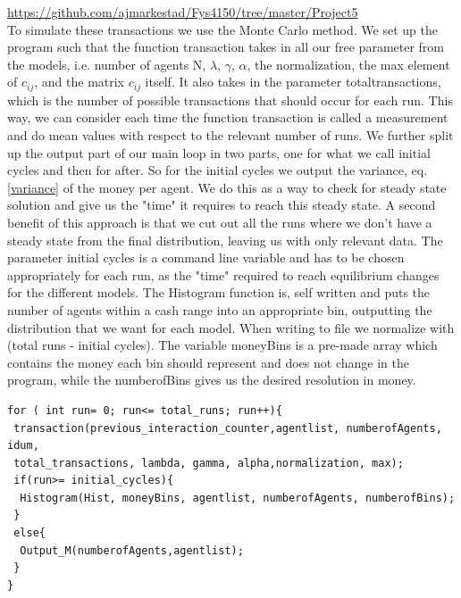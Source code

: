 \documentclass[a4paper,11pt]{article}
\begin{document}
{\url{https://github.com/ajmarkestad/Fys4150/tree/master/Project5}\\

To simulate these transactions we use the Monte Carlo method. We set up the program such that the function transaction takes in all our free parameter from the models, i.e. number of agents N, $\lambda$, $\gamma$, $\alpha$, the normalization, the max element of $c_{ij}$, and the matrix $c_{ij}$ itself. It also takes in the parameter totaltransactions, which is the number of possible transactions that should occur for each run. This way, we can consider each time the function transaction is called a measurement and do mean values with respect to the relevant number of runs. We further split up the output part of our main loop in two parts, one for what we call initial cycles and then for after. So for the initial cycles we output the variance, eq. \ref{variance} of the money per agent. We do this as a way to check for steady state solution and give us the "time" it requires to reach this steady state. A second benefit of this approach is that we cut out all the runs where we don't have a steady state from the final distribution, leaving us with only relevant data. The parameter initial cycles is a command line variable and has to be chosen appropriately for each run, as the "time" required to reach equilibrium changes for the different models. The Histogram function is, self written and puts the number of agents within a cash range into an appropriate bin, outputting the distribution that we want for each model. When writing to file we normalize with (total runs - initial cycles). The variable moneyBins is a pre-made array which contains the money each bin should represent and does not change in the program, while the numberofBins gives us the desired resolution in money. 

\begin{lstlisting}
for ( int run= 0; run<= total_runs; run++){
 transaction(previous_interaction_counter,agentlist, numberofAgents, idum, 
 total_transactions, lambda, gamma, alpha,normalization, max);
 if(run>= initial_cycles){
  Histogram(Hist, moneyBins, agentlist, numberofAgents, numberofBins);
 }
 else{
  Output_M(numberofAgents,agentlist);
 }
}
\end{lstlisting}

}
\end{document}
